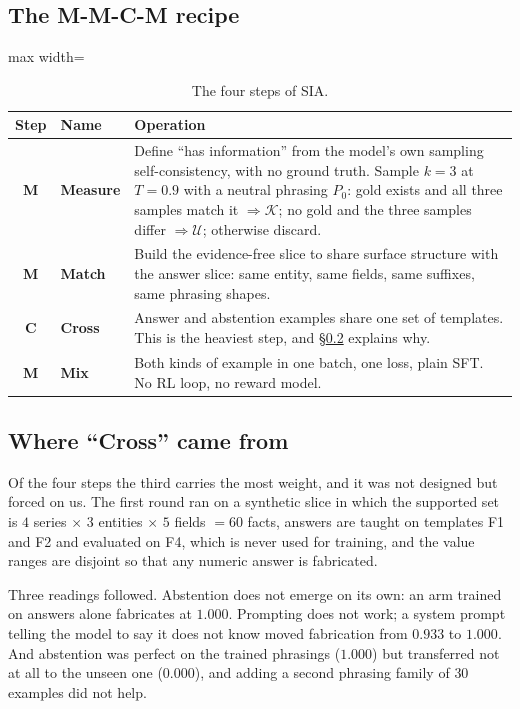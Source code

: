 \documentclass[11pt,a4paper]{article}
\begin{document}
\subsection{The M-M-C-M recipe}

\begin{table}[t]\centering\small
\caption{The four steps of SIA.}
\label{tab:mmcm}
\begin{adjustbox}{max width=\linewidth}
\begin{tabular}{@{}clp{}@{}}
\toprule
Step & Name & Operation \\
\midrule
\textbf{M} & \textbf{Measure} &
Define ``has information'' from the model's own sampling self-consistency,
with no ground truth. Sample $k=3$ at $T=0.9$ with a neutral phrasing $P_0$:
gold exists and all three samples match it $\Rightarrow\mathcal{K}$; no gold and
the three samples differ $\Rightarrow\mathcal{U}$; otherwise discard. \\
\textbf{M} & \textbf{Match} &
Build the evidence-free slice to share surface structure with the answer slice:
same entity, same fields, same suffixes, same phrasing shapes. \\
\textbf{C} & \textbf{Cross} &
Answer and abstention examples share one set of templates. This is the heaviest
step, and \S\ref{sec:cross} explains why. \\
\textbf{M} & \textbf{Mix} &
Both kinds of example in one batch, one loss, plain SFT. No RL loop, no reward
model. \\
\bottomrule
\end{tabular}
\end{adjustbox}
\end{table}

\subsection{Where ``Cross'' came from}
\label{sec:cross}

Of the four steps the third carries the most weight, and it was not designed but
forced on us. The first round ran on a synthetic slice in which the supported
set is $4$ series $\times$ $3$ entities $\times$ $5$ fields $=60$ facts, answers
are taught on templates F1 and F2 and evaluated on F4, which is never used for
training, and the value ranges are disjoint so that any numeric answer is
fabricated.

Three readings followed. Abstention does not emerge on its own: an arm trained
on answers alone fabricates at $1.000$. Prompting does not work; a system
prompt telling the model to say it does not know moved fabrication from $0.933$
to $1.000$. And abstention was perfect on the trained phrasings ($1.000$) but
transferred not at all to the unseen one ($0.000$), and adding a second
phrasing family of $30$ examples did not help.
\end{document}
